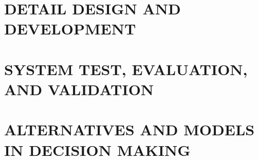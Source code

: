 
\chapter{DETAIL DESIGN AND DEVELOPMENT}

\begin{exercises}
    \begin{exercise}
    \label{sea-5-1}
    
    \end{exercise}
    \begin{solution}
    \end{solution}

\end{exercises}


\chapter{SYSTEM TEST, EVALUATION, AND VALIDATION}

\begin{exercises}
    \begin{exercise}
    \label{sea-6-1}
    
    \end{exercise}
    \begin{solution}
    \end{solution}

\end{exercises}


\chapter{ALTERNATIVES AND MODELS IN DECISION MAKING}

\begin{exercises}
    \begin{exercise}
    \label{sea-7-1}
    
    \end{exercise}
    \begin{solution}
    \end{solution}

\end{exercises}

